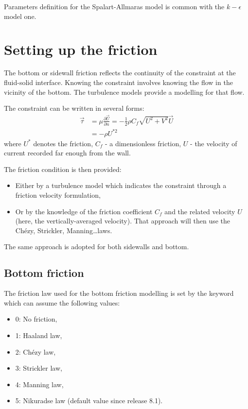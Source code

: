 Parameters definition for the Spalart-Allmaras model is common
with the $k-\epsilon$ model one.


\section{Setting up the friction}

The bottom or sidewall friction reflects the continuity of the constraint at
the fluid-solid interface. Knowing the constraint involves knowing the flow in
the vicinity of the bottom. The turbulence models provide a modelling for that
flow.

The constraint can be written in several forms:
\begin{align}
\vec{\tau } & = \mu \frac{\partial \vec{U}}{\partial n}
            = -\frac{1}{2} \rho C_{f} \sqrt{U^{2} +V^{2} } \vec{U}\\
            & = -\rho U^{*2}
\end{align}
where $U^{*}$ denotes the friction, $C_{f}$ - a dimensionless friction, $U$ -
the velocity of current recorded far enough from the wall.

The friction condition is then provided:

\begin{itemize}
\item  Either by a turbulence model which indicates the constraint through a
friction velocity formulation,

\item  Or by the knowledge of the friction coefficient $C_{f}$ and the related
velocity $U$ (here, the vertically-averaged velocity). That approach will then
use the Chézy, Strickler, Manning\dots  laws.
\end{itemize}

The same approach is adopted for both sidewalls and bottom.


\subsection{Bottom friction}

The friction law used for the bottom friction modelling is set by the keyword
 which can assume the following values:

\begin{itemize}
\item  0: No friction,

\item  1: Haaland law,

\item  2: Chézy law,

\item  3: Strickler law,

\item  4: Manning law,

\item  5: Nikuradse law (default value since release 8.1).
\end{itemize}

